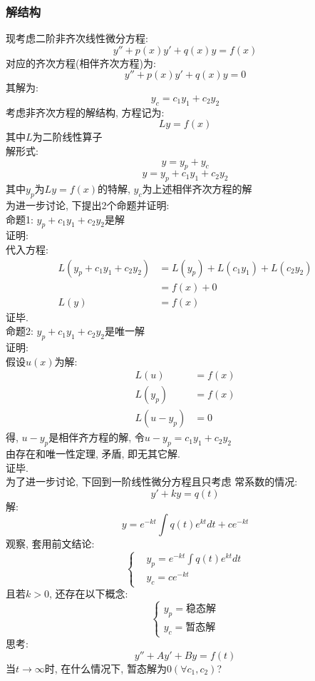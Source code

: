 \subsubsection{\large 解结构}
现考虑二阶非齐次线性微分方程:
{\Large \[ y'' + p(x)y' + q(x)y = f(x) \] }
对应的齐次方程(相伴齐次方程)为:
\[ y'' + p(x)y' + q(x)y = 0 \]
其解为:
\[ y_c = c_1 y_1 + c_2 y_2 \]
考虑非齐次方程的解结构, 方程记为:
\[ L y = f(x) \]
其中$L$为二阶线性算子\\
解形式:
\[ y = y_p + y_c \]
\[ y = y_p + c_1 y_1 + c_2 y_2 \]
其中$y_p$为$L y = f(x)$的特解, 
$y_c$为上述相伴齐次方程的解\\
为进一步讨论, 下提出2个命题并证明:\\
命题1: $y_p + c_1 y_1 + c_2 y_2$是解\\
证明:\\
代入方程:
\begin{align*}
L(y_p + c_1 y_1 + c_2 y_2) &= L(y_p) + L(c_1 y_1) + L(c_2 y_2) \\
    &= f(x) + 0 \\
L(y)    &= f(x)   
\end{align*}
证毕.\\[2em]
命题2: $y_p + c_1 y_1 + c_2 y_2$是唯一解\\
证明:\\
假设$u(x)$为解:
\begin{align*}
L(u) &= f(x) \\
L(y_p) &= f(x)\\
L(u - y_p) &= 0
\end{align*}
得, $u - y_p$是相伴齐方程的解, 
令$u - y_p = c_1 y_1 + c_2 y_2$\\
由存在和唯一性定理, 矛盾, 即无其它解.\\
证毕.\\
为了进一步讨论, 下回到一阶线性微分方程且只考虑
常系数的情况:
\[ y' + k y = q(t) \]
解:
\[ y = e^{-kt} \int q(t) e^{kt} dt + ce^{-kt} \]
观察, 套用前文结论:
\[
\left\{
\begin{aligned}
    &y_p = e^{-kt} \int q(t) e^{kt} dt\\
    &y_c = ce^{-kt} 
\end{aligned}
\right.
\]
且若$k > 0$, 还存在以下概念:
\[
\left\{
\begin{aligned}
    y_p = \text{稳态解}  \\
    y_c = \text{暂态解}
\end{aligned}
\right.
\]
思考:
\[ y'' + A y' + By = f(t) \]
当$t \to \infty$时, 在什么情况下, 暂态解为0$(\forall c_1, c_2)$?\\
